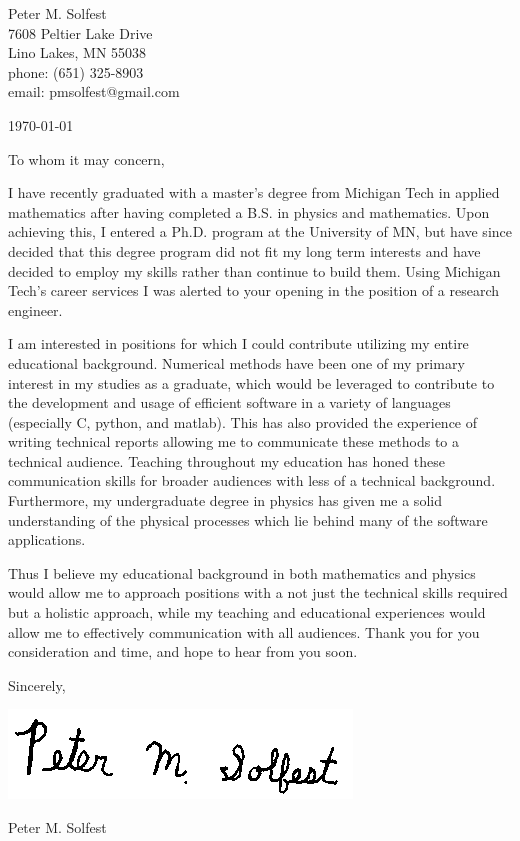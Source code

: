 \documentclass[letterpaper,12pt]{article}
\begin{document}
Peter M. Solfest\\
7608 Peltier Lake Drive\\
Lino Lakes, MN 55038\\
phone: (651) 325-8903\\
email: pmsolfest@gmail.com

\today


To whom it may concern, %

I have recently graduated with a master's degree from Michigan Tech in applied mathematics after
having completed a B.S. in physics and mathematics.
Upon achieving this, I entered a Ph.D. program at the University of MN, but have since
decided that this degree program did not fit my long term interests and have decided to
employ my skills rather than continue to build them.
Using Michigan Tech's career services I was alerted to your opening in the position of a
research engineer.

I am interested in positions for which I could contribute utilizing my entire educational background.
Numerical methods have been one of my primary interest in my studies as a graduate,
which would be leveraged to contribute to the development and usage of efficient software in a 
variety of languages (especially C, python, and matlab).
This has also provided the experience of writing technical reports allowing me to 
communicate these methods to a technical audience.
Teaching throughout my education has honed these communication skills 
for broader audiences with less of a technical background.
Furthermore, my undergraduate degree in physics has given me a solid understanding of the
physical processes which lie behind many of the software applications.

Thus I believe my educational background in both mathematics and physics would allow 
me to approach positions with a not just the technical skills required but a holistic approach,
while my teaching and educational experiences would allow me to 
effectively communication with all audiences.
Thank you for you consideration and time, and hope to hear from you soon.

Sincerely,

\includegraphics[height=.5in]{signature.png}

Peter M. Solfest
\end{document}
